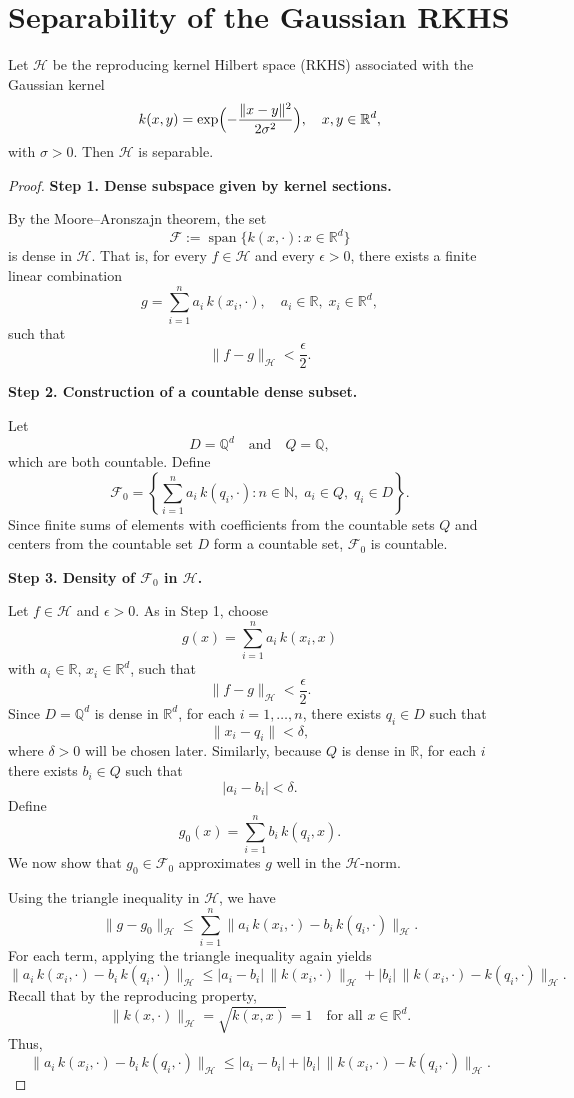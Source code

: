 \section{Separability of the Gaussian RKHS}

\begin{theorem}
Let $\mathcal{H}$ be the reproducing kernel Hilbert space (RKHS) associated with the Gaussian kernel
\[
k(x,y)=\exp\Bigl(-\frac{\|x-y\|^2}{2\sigma^2}\Bigr), \quad x,y\in\mathbb{R}^d,
\]
with $\sigma>0$. Then $\mathcal{H}$ is separable.
\end{theorem}

\begin{proof}


\textbf{Step 1. Dense subspace given by kernel sections.}

By the Moore--Aronszajn theorem, the set
\[
\mathcal{F} := \operatorname{span}\{ k(x,\cdot) : x \in \mathbb{R}^d \}
\]
is dense in $\mathcal{H}$. That is, for every $f\in\mathcal{H}$ and every $\epsilon>0$, there exists a finite linear combination
\[
g = \sum_{i=1}^n a_i\, k(x_i,\cdot), \quad a_i\in\mathbb{R},\; x_i\in\mathbb{R}^d,
\]
such that
\[
\|f - g\|_{\mathcal{H}} < \frac{\epsilon}{2}.
\]

\textbf{Step 2. Construction of a countable dense subset.}

Let
\[
D = \mathbb{Q}^d \quad \text{and} \quad Q = \mathbb{Q},
\]
which are both countable. Define
\[
\mathcal{F}_0 = \left\{ \sum_{i=1}^n a_i\, k(q_i,\cdot) : n\in\mathbb{N},\; a_i\in Q,\; q_i\in D \right\}.
\]
Since finite sums of elements with coefficients from the countable sets $Q$ and centers from the countable set $D$ form a countable set, $\mathcal{F}_0$ is countable.

\textbf{Step 3. Density of $\mathcal{F}_0$ in $\mathcal{H}$.}

Let $f\in\mathcal{H}$ and $\epsilon>0$. As in Step 1, choose
\[
g(x)=\sum_{i=1}^n a_i\, k(x_i,x)
\]
with $a_i\in\mathbb{R}$, $x_i\in\mathbb{R}^d$, such that
\[
\|f-g\|_{\mathcal{H}} < \frac{\epsilon}{2}.
\]
Since $D=\mathbb{Q}^d$ is dense in $\mathbb{R}^d$, for each $i=1,\dots,n$, there exists $q_i\in D$ such that
\[
\|x_i-q_i\| < \delta,
\]
where $\delta>0$ will be chosen later. Similarly, because $Q$ is dense in $\mathbb{R}$, for each $i$ there exists $b_i\in Q$ such that
\[
|a_i - b_i| < \delta.
\]
Define
\[
g_0(x)=\sum_{i=1}^n b_i\, k(q_i,x).
\]
We now show that $g_0\in\mathcal{F}_0$ approximates $g$ well in the $\mathcal{H}$-norm.

Using the triangle inequality in $\mathcal{H}$, we have
\[
\|g - g_0\|_{\mathcal{H}} \le \sum_{i=1}^n \|a_i\, k(x_i,\cdot) - b_i\, k(q_i,\cdot)\|_{\mathcal{H}}.
\]
For each term, applying the triangle inequality again yields
\[
\|a_i\, k(x_i,\cdot) - b_i\, k(q_i,\cdot)\|_{\mathcal{H}} \le |a_i - b_i|\, \|k(x_i,\cdot)\|_{\mathcal{H}} + |b_i|\, \|k(x_i,\cdot)- k(q_i,\cdot)\|_{\mathcal{H}}.
\]
Recall that by the reproducing property, 
\[
\|k(x,\cdot)\|_{\mathcal{H}} = \sqrt{k(x,x)} = 1 \quad \text{for all } x\in\mathbb{R}^d.
\]
Thus,
\[
\|a_i\, k(x_i,\cdot) - b_i\, k(q_i,\cdot)\|_{\mathcal{H}} \le |a_i - b_i| + |b_i|\, \|k(x_i,\cdot)- k(q_i,\cdot)\|_{\mathcal{H}}.
\]


\end{proof}
